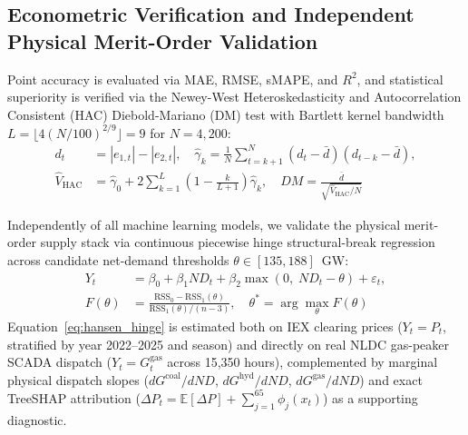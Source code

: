 \documentclass[runningheads,a4paper]{llncs}
\begin{document}
\subsection{Econometric Verification and Independent Physical Merit-Order Validation}
Point accuracy is evaluated via MAE, RMSE, sMAPE, and $R^2$, and statistical superiority is verified via the Newey-West Heteroskedasticity and Autocorrelation Consistent (HAC) Diebold-Mariano (DM) test \cite{diebold1995comparing,newey1987simple} with Bartlett kernel bandwidth $L = \lfloor 4(N/100)^{2/9} \rfloor = 9$ for $N = 4,200$:
\begin{equation}
\begin{aligned}
d_t &= |e_{1,t}| - |e_{2,t}|, \quad \hat{\gamma}_k = \frac{1}{N}\sum_{t=k+1}^{N} (d_t - \bar{d})(d_{t-k} - \bar{d}), \\
\hat{V}_{\text{HAC}} &= \hat{\gamma}_0 + 2\sum_{k=1}^{L}\left(1 - \frac{k}{L+1}\right)\hat{\gamma}_k, \quad DM = \frac{\bar{d}}{\sqrt{\hat{V}_{\text{HAC}}/N}}
\end{aligned}
\label{eq:dm_hac}
\end{equation}

Independently of all machine learning models, we validate the physical merit-order supply stack via continuous piecewise hinge structural-break regression \cite{hansen2000sample} across candidate net-demand thresholds $\theta \in [135, 188]$~GW:
\begin{equation}
\begin{aligned}
Y_t &= \beta_0 + \beta_1 ND_t + \beta_2 \max(0, \; ND_t - \theta) + \varepsilon_t, \\
F(\theta) &= \frac{\text{RSS}_0 - \text{RSS}_1(\theta)}{\text{RSS}_1(\theta) / (n - 3)}, \quad \theta^* = \arg\max_{\theta} F(\theta)
\end{aligned}
\label{eq:hansen_hinge}
\end{equation}
Equation~\ref{eq:hansen_hinge} is estimated both on IEX clearing prices ($Y_t = P_t$, stratified by year 2022--2025 and season) and directly on real NLDC gas-peaker SCADA dispatch ($Y_t = G_t^{\text{gas}}$ across 15,350 hours), complemented by marginal physical dispatch slopes ($dG^{\text{coal}}/dND$, $dG^{\text{hyd}}/dND$, $dG^{\text{gas}}/dND$) and exact TreeSHAP attribution \cite{lundberg2020local} ($\Delta P_t = \mathbb{E}[\Delta P] + \sum_{j=1}^{65}\phi_j(x_t)$) as a supporting diagnostic.
\end{document}
